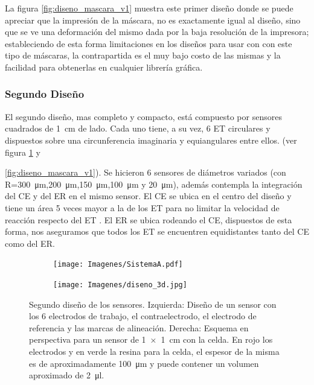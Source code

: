 		 La figura \ref{fig:diseno_mascara_v1} muestra este primer diseño donde se puede apreciar que la impresión de la máscara, no es exactamente igual al diseño, sino que se ve una deformación del mismo dada por la baja resolución de la impresora; estableciendo de esta forma limitaciones en los diseños para usar con con este tipo de máscaras, la contrapartida es el muy bajo costo de las mismas y la facilidad para obtenerlas en cualquier librería gráfica.
		
 		 \subsubsection{Segundo Diseño}

		 El segundo diseño, mas completo y compacto, está compuesto por sensores cuadrados de \SI{1}{\cm} de lado. Cada uno tiene, a su vez, 6 ET circulares y dispuestos sobre una circunferencia imaginaria y equiangulares entre ellos. (ver figura \ref{fig:mascara_diseno_v2} y {\ref{fig:diseno_mascara_v1}). Se hicieron 6 sensores de diámetros variados (con R=\SI{300}{\um},\SI{200}{\um},\SI{150}{\um},\SI{100}{\um} y \SI{20}{\um}), además contempla la integración del CE y del ER en el mismo sensor. El CE se ubica en el centro del diseño y tiene un área 5 veces mayor a la de los ET para no limitar la velocidad de reacción respecto del ET \cite{Wi2000}. El ER se ubica rodeando el CE, dispuestos de esta forma, nos aseguramos que todos los ET se encuentren equidistantes tanto del CE como del ER.

						\begin{figure}[th!]
			 	   	    \begin{subfigure}[t]{0.395\textwidth}
			        	\texttt{[image: Imagenes/SistemaA.pdf]}
			    		\end{subfigure}
						\begin{subfigure}[t]{0.595\textwidth}
			     		\texttt{[image: Imagenes/diseno\_3d.jpg]}
			        	\end{subfigure}
			     		\caption[Segundo diseño y máscara de los sensores]{Segundo diseño de los sensores. Izquierda: Diseño de un sensor con los 6 electrodos de trabajo, el contraelectrodo, el electrodo de referencia y las marcas de alineación. Derecha: Esquema en perspectiva para un sensor de \SI{1x1}{\cm} con la celda. En rojo los electrodos y en verde la resina para la celda, el espesor de la misma es de aproximadamente \SI{100}{\um} y puede contener un volumen aproximado de \SI{2}{\ul}.}
			     		\label{fig:mascara_diseno_v2}
			     		\end{figure}

}
